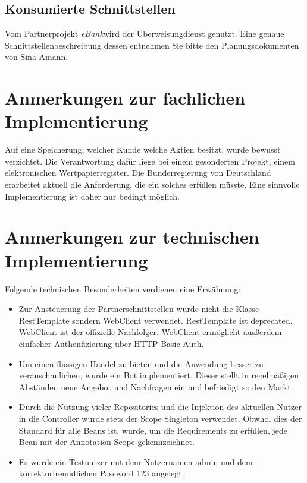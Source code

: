 \documentclass[12pt, a4paper, titlepage]{article}
\newcommand{\sina}[0]{Sina Amann}
\newcommand{\sinaProj}[0]{\textit{eBank}}
\begin{document}
\subsection{Konsumierte Schnittstellen}
Vom Partnerprojekt \sinaProj wird der Überweisungdienst genutzt. Eine genaue
Schnittstellenbeschreibung dessen entnehmen Sie bitte den Planungsdokumenten
von \sina.


\section{Anmerkungen zur fachlichen Implementierung}
Auf eine Speicherung, welcher Kunde welche Aktien besitzt, wurde bewusst
verzichtet. Die Verantwortung dafür liege bei einem gesonderten Projekt,
einem elektronischen Wertpapierregister. Die Bunderregierung von Deutschland
erarbeitet aktuell die Anforderung, die ein solches erfüllen müsste.
Eine sinnvolle Implementierung ist daher nur bedingt möglich.

\section{Anmerkungen zur technischen Implementierung}
Folgende technischen Besonderheiten verdienen eine Erwähnung:
\begin{itemize}
	\item Zur Ansteuerung der Partnerschnittstellen wurde nicht die Klasse
	RestTemplate sondern WebClient verwendet. RestTemplate ist deprecated.
	WebClient ist der offizielle Nachfolger. WebClient ermöglicht ausßerdem
	einfacher Authenfizierung über HTTP Basic Auth.
	\item Um einen flüssigen Handel zu bieten und die Anwendung besser zu
	veranschaulichen, wurde ein Bot implementiert. Dieser stellt in regelmäßigen
	Abständen neue Angebot und Nachfragen ein und befriedigt so den Markt.
	\item Durch die Nutzung vieler Repositories und die Injektion des aktuellen
	Nutzer in die Controller wurde stets der Scope Singleton verwendet.
	Obwhol dies der Standard für alle Beans ist, wurde, um die Requirements zu
	erfüllen, jede Bean mit der Annotation Scope gekennzeichnet.
	\item Es wurde ein Testnutzer mit dem Nutzernamen admin und dem
	korrektorfreundlichen Password 123 angelegt.
\end{itemize}
\end{document}
